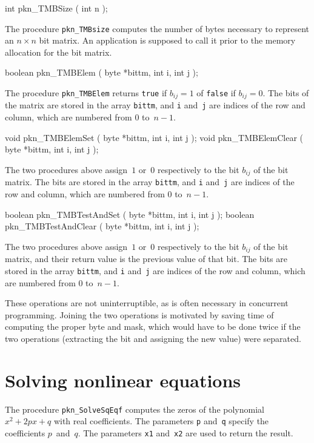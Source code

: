 \medskip
\begin{listingC}
int pkn_TMBSize ( int n );
\end{listingC}
The procedure \texttt{pkn\_TMBsize} computes the number of bytes necessary
to represent an $n\times n$ bit matrix. An application is supposed to call
it prior to the memory allocation for the bit matrix.

\medskip
\begin{listingC}
boolean pkn_TMBElem ( byte *bittm, int i, int j );
\end{listingC}
The procedure \texttt{pkn\_TMBElem} returns \texttt{true} if $b_{ij}=1$
of \texttt{false} if $b_{ij}=0$. The bits of the matrix are stored in the
array \texttt{bittm}, and \texttt{i} and~\texttt{j} are indices of the row
and column, which are numbered from $0$ to~$n-1$.

\medskip
\begin{listingC}
void pkn_TMBElemSet ( byte *bittm, int i, int j );
void pkn_TMBElemClear ( byte *bittm, int i, int j );
\end{listingC}
The two procedures above assign~$1$ or~$0$ respectively to the bit $b_{ij}$
of the bit matrix. The bits are stored in the array \texttt{bittm}, and
\texttt{i} and~\texttt{j} are indices of the row
and column, which are numbered from $0$ to~$n-1$.

\medskip
\begin{listingC}
boolean pkn_TMBTestAndSet ( byte *bittm, int i, int j );
boolean pkn_TMBTestAndClear ( byte *bittm, int i, int j );
\end{listingC}
The two procedures above assign~$1$ or~$0$ respectively to the bit $b_{ij}$
of the bit matrix, and their return value is the previous value of that bit.
The bits are stored in the array \texttt{bittm}, and \texttt{i} and~\texttt{j}
are indices of the row and column, which are numbered from $0$ to~$n-1$.

These operations are not uninterruptible, as is often necessary in
concurrent programming. Joining the two operations is motivated by saving
time of computing the proper byte and mask, which would have to be done
twice if the two operations (extracting the bit and assigning the new value)
were separated.


\newpage
\section{Solving nonlinear equations}

\hspace*{\parindent}
The procedure \texttt{pkn\_SolveSqEqf} computes the zeros of the polynomial
$x^2+2px+q$ with real coefficients.
The parameters \texttt{p} and~\texttt{q} specify the coefficients
$p$~and~$q$. The parameters \texttt{x1} and~\texttt{x2} are used to return
the result.

